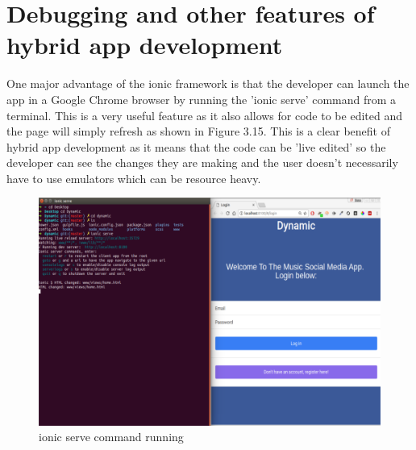 \section{Debugging and other features of hybrid app development}
One major advantage of the ionic framework is that the developer can launch the app in a Google Chrome browser by running the 'ionic serve' command from a terminal. This is a very useful feature as it also allows for code to be edited and the page will simply refresh as shown in Figure 3.15. This is a clear benefit of hybrid app development as it means that the code can be 'live edited' so the developer can see the changes they are making and the user doesn't necessarily have to use emulators which can be resource heavy.
\begin{center}
\begin{figure}[H]
\includegraphics[scale=0.45]{images/chrome}
\caption{ionic serve command running}
\end{figure}
\end{center}

